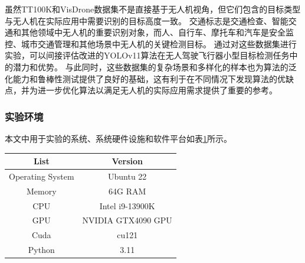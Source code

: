 \begin{figure}[htbp]
    \centering
    \captionsetup{font=footnotesize}
    \label{fig:vd_figure}
\end{figure}

虽然TT100K和VisDrone数据集不是直接基于无人机视角，但它们包含的目标类型与无人机在实际应用中需要识别的目标高度一致。
交通标志是交通检查、智能交通和其他领域中无人机的重要识别对象，而人、自行车、摩托车和汽车是安全监控、城市交通管理和其他场景中无人机的关键检测目标。
通过对这些数据集进行实验，可以间接评估改进的YOLOv11算法在无人驾驶飞行器小型目标检测任务中的潜力和优势。
与此同时，这些数据集的复杂场景和多样化的样本也为算法的泛化能力和鲁棒性测试提供了良好的基础，这有利于在不同情况下发现算法的优缺点，并为进一步优化算法以满足无人机的实际应用需求提供了重要的参考。

\subsubsection{实验环境}

本文中用于实验的系统、系统硬件设施和软件平台如表\ref{tab:environment}所示。
\begin{table}[htbp]
    \centering
    \captionsetup{font=footnotesize}
    \label{tab:environment}
    \begin{tabular}{cc}
        \toprule
        List              & Version            \\ 
        \midrule
        Operating System  & Ubuntu 22          \\
        Memory            & 64G RAM            \\
        CPU               & Intel i9-13900K    \\
        GPU               & NVIDIA GTX4090 GPU \\
        Cuda              & cu121              \\
        Python            & 3.11               \\
        \bottomrule
    \end{tabular}
\end{table}

